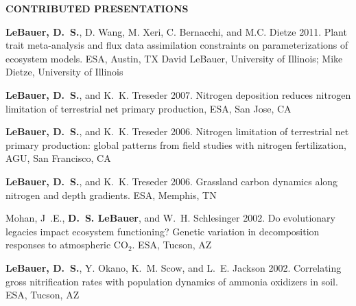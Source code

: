 \documentclass[10pt,twoside]{article}
\begin{document}
\textbf{CONTRIBUTED PRESENTATIONS}\\
\begin{itemize*}
\item \textbf{LeBauer, D.~S.}, D. Wang, M. Xeri, C. Bernacchi, and M.C. Dietze 2011. Plant trait meta-analysis and flux data assimilation constraints on parameterizations of ecosystem models. ESA, Austin, TX
David LeBauer, University of Illinois; Mike Dietze, University of Illinois
\item  \textbf{LeBauer, D.~S.}, and K.~K. Treseder 2007. Nitrogen deposition reduces nitrogen limitation of terrestrial net primary production, ESA, San Jose, CA
\item \textbf{LeBauer, D.~S.}, and K.~K. Treseder 2006. Nitrogen limitation of terrestrial net primary production: global patterns from field studies with nitrogen fertilization, AGU, San Francisco, CA
\item \textbf{LeBauer, D.~S.}, and K.~K. Treseder 2006. Grassland carbon dynamics along nitrogen and depth gradients. ESA, Memphis, TN
\item Mohan, J~.E., \textbf{D.~S. LeBauer}, and W.~H. Schlesinger 2002. Do evolutionary legacies impact ecosystem functioning? Genetic variation in decomposition responses to atmospheric CO$_2$. ESA, Tucson, AZ
\item \textbf{LeBauer, D.~S.}, Y. Okano, K.~M. Scow, and L.~E. Jackson 2002. Correlating gross nitrification rates with population dynamics of ammonia oxidizers in soil. ESA, Tucson, AZ

\end{itemize*}
\end{document}
